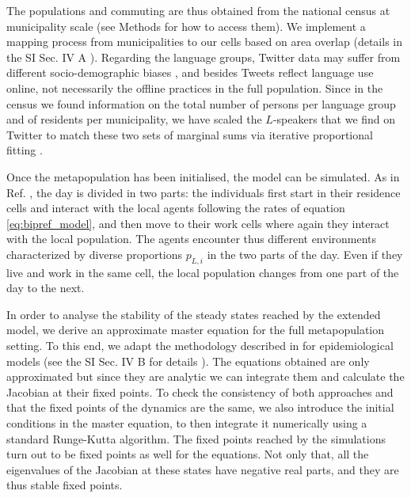 \documentclass[../thesis.tex]{subfiles}
\begin{document}
The populations and commuting are thus obtained from the national census at municipality
scale (see Methods for how to access them). We implement a mapping process from
municipalities to our cells based on area overlap (details in the SI Sec. IV A
\cite{supp}). Regarding the language groups, Twitter data may suffer from different
socio-demographic biases
\cite{MisloveUnderstandingDemographics2011,NguyenAudienceUse2015}, and besides Tweets
reflect language use online, not necessarily the offline practices in the full
population. Since in the census we found information on the total number of persons per
language group and of residents per municipality, we have scaled the $L$-speakers that
we find on Twitter to match these two sets of marginal sums via iterative proportional
fitting \cite{DemingLeastSquares1940,FienbergIterativeProcedure1970}.

Once the metapopulation has been initialised, the model can be simulated. As in Ref.
\cite{Fernandez-GraciaVoterModel2014}, the day is divided in two parts: the individuals
first start in their residence cells and interact with the local agents following the
rates of equation \eqref{eq:bipref_model}, and then move to their work cells where again
they interact with the local population. The agents encounter thus different
environments characterized by diverse proportions $p_{L,i}$ in the two parts of the day.
Even if they live and work in the same cell, the local population changes from one part
of the day to the next.

In order to analyse the stability of the steady states reached by the extended model, we
derive an approximate master equation for the full metapopulation setting. To this end,
we adapt the methodology described in 
\cite{SattenspielStructuredEpidemic1995,BalcanModelingSpatial2010} for epidemiological
models (see the SI Sec. IV B for details \cite{supp}). The equations obtained are only
approximated but since they are analytic we can integrate them and calculate the
Jacobian at their fixed points. To check the consistency of both approaches and that the
fixed points of the dynamics are the same, we also introduce the initial conditions in
the master equation, to then integrate it numerically using a standard Runge-Kutta
algorithm. The fixed points reached by the simulations turn out to be fixed points as
well for the equations. Not only that, all the eigenvalues of the Jacobian at these
states have negative real parts, and they are thus stable fixed points.
\end{document}
